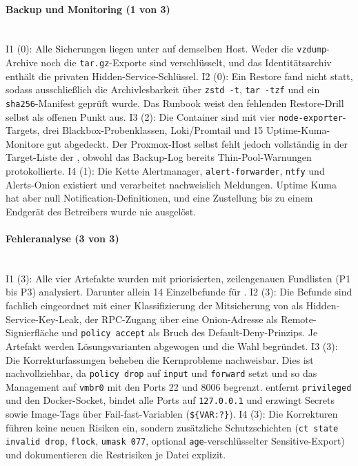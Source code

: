 \paragraph{Backup und Monitoring (1 von 3)} \mbox{}\\
I1 (0): Alle Sicherungen liegen unter  auf demselben Host. Weder die \texttt{vzdump}-Archive noch die \texttt{tar.gz}-Exporte sind verschlüsselt, und das Identitätsarchiv enthält die privaten Hidden-Service-Schlüssel.\cite{backupscriptA,selfauditA}
I2 (0): Ein Restore fand nicht statt, sodass ausschließlich die Archivlesbarkeit über \texttt{zstd -t}, \texttt{tar -tzf} und ein \texttt{sha256}-Manifest geprüft wurde.
Das Runbook weist den fehlenden Restore-Drill selbst als offenen Punkt aus.\cite{backupscriptA,runbookA}
I3 (2): Die Container sind mit vier \texttt{node-exporter}-Targets,
drei Blackbox-Probenklassen, Loki/Promtail und 15 Uptime-Kuma-Monitore gut abgedeckt.
Der Proxmox-Host selbst fehlt jedoch vollständig in der Target-Liste der
, obwohl das Backup-Log bereits Thin-Pool-Warnungen protokollierte.\cite{prometheusconfigA,selfauditA,runbookA}
I4 (1): Die Kette Alertmanager, \texttt{alert-forwarder}, \texttt{ntfy} und Alerts-Onion existiert und verarbeitet nachweislich Meldungen. 
Uptime Kuma hat aber null Notification-Definitionen, und eine Zustellung bis zu einem Endgerät
des Betreibers wurde nie ausgelöst.\cite{selfauditA,runbookA}

\paragraph{Fehleranalyse (3 von 3)} \mbox{}\\
I1 (3): Alle vier Artefakte wurden mit priorisierten, zeilengenauen Fundlisten (P1 bis P3) analysiert. Darunter allein 14 Einzelbefunde für .\cite{artefaktpruefungA}
I2 (3): Die Befunde sind fachlich eingeordnet mit einer Klassifizierung der Mitsicherung von
 als Hidden-Service-Key-Leak, der \ac{RPC}-Zugang über eine Onion-Adresse als Remote-Signierfläche und \texttt{policy accept} als Bruch des Default-Deny-Prinzips.
Je Artefakt werden Lösungsvarianten abgewogen und die Wahl begründet.\cite{artefaktpruefungA}
I3 (3): Die Korrekturfassungen beheben die Kernprobleme nachweisbar. Dies ist nachvollziehbar, da
 \texttt{policy drop} auf \texttt{input} und
\texttt{forward} setzt und so das Management auf \texttt{vmbr0} mit den Ports 22
und 8006 begrenzt.
 entfernt \texttt{privileged} und den Docker-Socket, bindet alle Ports auf \texttt{127.0.0.1} und erzwingt Secrets sowie Image-Tags über Fail-fast-Variablen (\texttt{\$\{VAR:?\}}).\cite{artefaktpruefungA}
I4 (3): Die Korrekturen führen keine neuen Risiken ein, sondern zusätzliche Schutzschichten (\texttt{ct state invalid drop}, \texttt{flock}, \texttt{umask 077}, optional \texttt{age}-verschlüsselter Sensitive-Export) und dokumentieren die Restrisiken je Datei explizit.\cite{artefaktpruefungA}

